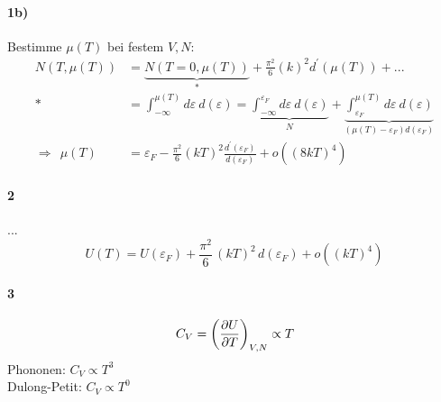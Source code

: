\paragraph{1b)} Bestimme $\mu (T)$ bei festem $V,N$:
\begin{align}
    N(T,\mu(T))&= \underbrace{N(T=0,\mu(T))}_{*} + \frac{\pi^2}{6} (k)^2 d^\prime(\mu(T)) + ...\\
    * &=\int_{-\infty}^{\mu(T)} d\varepsilon \ d(\varepsilon) = \underbrace{\int_{-\infty}^{\varepsilon_F} d\varepsilon \ d(\varepsilon)}_{N} + \underbrace{\int_{\varepsilon_F}^{\mu(T)} d\varepsilon \ d(\varepsilon)}_{(\mu(T)-\varepsilon_F) d(\varepsilon_F)}\\
    \Rightarrow \ \ \mu(T)&= \varepsilon_F - \frac{\pi^2}{6} (kT)^2 \frac{d^\prime(\varepsilon_F)}{d(\varepsilon_F)} + o\left( (8kT)^4 \right)
\end{align}

\paragraph{2} ...
\begin{equation}
    U(T) = U(\varepsilon_F) + \frac{\pi^2}{6} \, (kT)^2 \, d(\varepsilon_F) + o\left((kT)^4 \right)
\end{equation}

\paragraph{3}
\begin{equation}
    C_V = \left( \pdv{U}{T} \right)_{V,N} \propto T
\end{equation}
Phononen: $C_V \propto T^3$ \\
Dulong-Petit: $C_V \propto T^0$
\begin{center}
\end{center}


